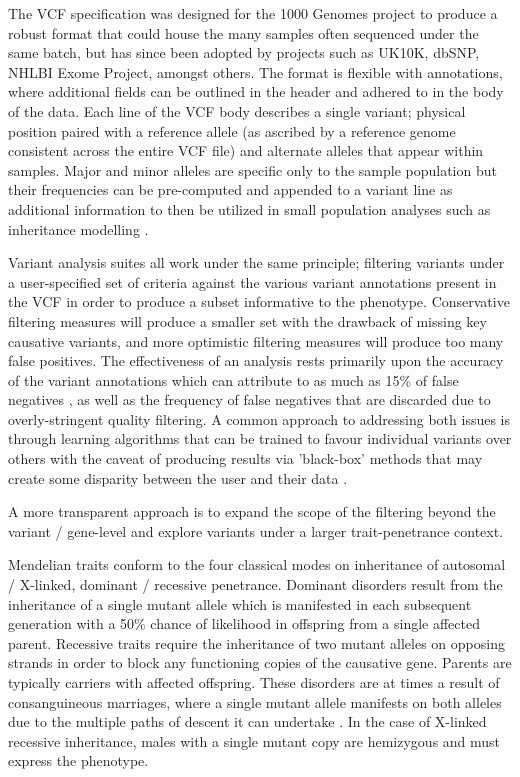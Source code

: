 \documentclass[twocolumn]{bmcart}%
\newcommand{\changes}[1]{{\color{red} #1}}
\begin{document}
The VCF specification was designed for the 1000 Genomes project to produce a robust format that could house the many samples often sequenced under the same batch, but has since been adopted by projects such as UK10K, dbSNP, NHLBI Exome Project, amongst others. The format is flexible with annotations, where additional fields can be outlined in the header and adhered to in the body of the data. Each line of the VCF body describes a single variant; physical position paired with a reference allele (as ascribed by a reference genome consistent across the entire VCF file) and alternate alleles that appear within samples. Major and minor alleles are specific only to the sample population but their frequencies can be pre-computed and appended to a variant line as additional information to then be utilized in small population analyses such as inheritance modelling \cite{danecek2011variant}.

Variant analysis suites all work under the same principle; filtering variants under a user-specified set of criteria against the various variant annotations present in the VCF in order to produce a subset informative to the phenotype. \changes{Conservative filtering measures will produce a smaller set with the drawback of missing key causative variants, and more optimistic filtering measures will produce too many false positives}. The effectiveness of an analysis rests primarily upon the accuracy of the variant annotations which can attribute to as much as 15\% of false negatives \cite{warden2014detailed}, as well as the frequency of false negatives that are discarded due to overly-stringent quality filtering. A common approach to addressing both issues is through learning algorithms that can be trained to favour individual variants over others with the caveat of producing results via 'black-box' methods that may create some disparity between the user and their data \cite{pabinger2014survey}.

A more transparent approach is to expand the scope of the filtering beyond the variant / gene-level and explore variants under a larger trait-penetrance context.%

Mendelian traits conform to the four classical modes on inheritance of autosomal / X-linked, dominant / recessive penetrance. Dominant disorders result from the inheritance of a single mutant allele which is manifested in each subsequent generation with a 50\% chance of likelihood in offspring from a single affected parent. Recessive traits require the inheritance of two mutant alleles on opposing strands in order to block any functioning copies of the causative gene. Parents are typically carriers with affected offspring. These disorders are at times a result of consanguineous marriages, where a single mutant allele manifests on both alleles due to the multiple paths of descent it can undertake \cite{kari2014consanguinity}. In the case of X-linked recessive inheritance, males with a single mutant copy are hemizygous and must express the phenotype. %
\end{document}
